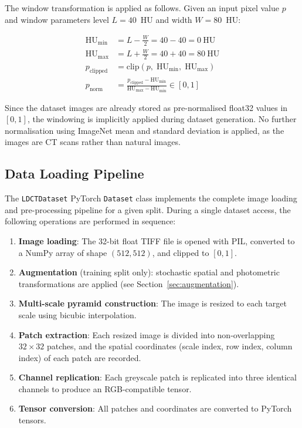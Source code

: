 The window transformation is applied as follows. Given an input pixel value $p$ and
window parameters level $L = 40$~HU and width $W = 80$~HU:

\begin{align}
    \text{HU}_{\min} &= L - \frac{W}{2} = 40 - 40 = 0~\text{HU} \label{eq:humin}\\
    \text{HU}_{\max} &= L + \frac{W}{2} = 40 + 40 = 80~\text{HU} \label{eq:humax}\\
    p_{\text{clipped}} &= \text{clip}(p,\; \text{HU}_{\min},\; \text{HU}_{\max}) \label{eq:clip}\\
    p_{\text{norm}} &= \frac{p_{\text{clipped}} - \text{HU}_{\min}}{\text{HU}_{\max} - \text{HU}_{\min}} \in [0, 1] \label{eq:norm_window}
\end{align}

Since the dataset images are already stored as pre-normalised float32 values in $[0,1]$,
the windowing is implicitly applied during dataset generation. No further normalisation
using ImageNet mean and standard deviation is applied, as the images are CT scans rather
than natural images.

\subsection{Data Loading Pipeline}

The \texttt{LDCTDataset} PyTorch \texttt{Dataset} class implements the complete image
loading and pre-processing pipeline for a given split. During a single dataset access,
the following operations are performed in sequence:

\begin{enumerate}
    \item \textbf{Image loading}: The 32-bit float TIFF file is opened with PIL,
          converted to a NumPy array of shape $(512, 512)$, and clipped to $[0, 1]$.
    \item \textbf{Augmentation} (training split only): stochastic spatial and
          photometric transformations are applied (see Section~\ref{sec:augmentation}).
    \item \textbf{Multi-scale pyramid construction}: The image is resized to each
          target scale using bicubic interpolation.
    \item \textbf{Patch extraction}: Each resized image is divided into
          non-overlapping $32 \times 32$ patches, and the spatial coordinates
          (scale index, row index, column index) of each patch are recorded.
    \item \textbf{Channel replication}: Each greyscale patch is replicated into
          three identical channels to produce an RGB-compatible tensor.
    \item \textbf{Tensor conversion}: All patches and coordinates are converted to
          PyTorch tensors.
\end{enumerate}

